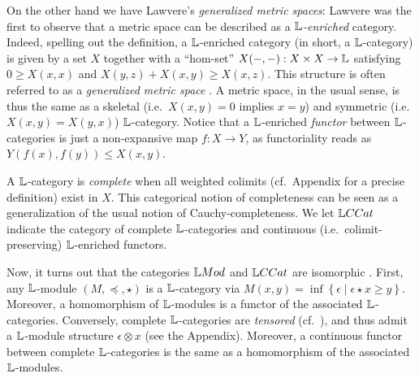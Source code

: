 On the other hand we have Lawvere's \emph{generalized metric spaces}:
Lawvere was the first to observe that a metric space can be described as a \emph{$\mathbb{L}$-enriched} category. Indeed, spelling out the definition, a $\mathbb{L}$-enriched category (in short, a $\mathbb{L}$-category) is given by a set $X$ together with a ``hom-set'' $X(-,-):X\times X\to \mathbb{L}$ satisfying 
$0  \geq X(x,x)$ and $X(y,z)+X(x,y)\geq  X(x,z)$. This structure is often referred to as a \emph{generalized metric space} \cite{Lawvere1973, Hofmann2014, Stubbe2014}. %
 A metric space, in the usual sense, is thus the same as a skeletal (i.e.~$X(x,y)=0$ implies $x=y$) and symmetric (i.e.~$X(x,y)=X(y,x)$) $\mathbb{L}$-category.
Notice that a $\mathbb{L}$-enriched \emph{functor} between $\mathbb{L}$-categories is just a non-expansive map $f:X\to Y$, as functoriality reads as $Y(f(x),f(y))\leq X(x,y)$.


A $\mathbb{L}$-category is \emph{complete} when all weighted colimits (cf.~Appendix for a precise definition) exist in $X$. This categorical notion of completeness can be seen as a generalization of the usual notion of Cauchy-completeness.
We let $\GMet$ indicate the category of complete $\mathbb{L}$-categories and continuous (i.e.~colimit-preserving) $\mathbb{L}$-enriched functors. 

Now, it turns out that the categories $\Mod$ and $\GMet$ are isomorphic \cite{Stubbe2006}. First,  any $\mathbb{L}$-module $(M,\preceq, \star)$ is a $\mathbb{L}$-category via
$M(x,y) = \inf\left\{ \epsilon \mid \epsilon \star x\geq y\right\}$. Moreover, a homomorphism of $\mathbb{L}$-modules is a functor of the associated $\mathbb{L}$-categories. Conversely, complete $\mathbb{L}$-categories are \emph{tensored} (cf.~\cite{Stubbe2014}), and thus admit a $\mathbb{L}$-module structure $\epsilon \otimes x$ (see the Appendix).
Moreover, a continuous functor between complete $\mathbb{L}$-categories is the same as a homomorphism of the associated $\mathbb{L}$-modules. 
%
%
%
%
%

